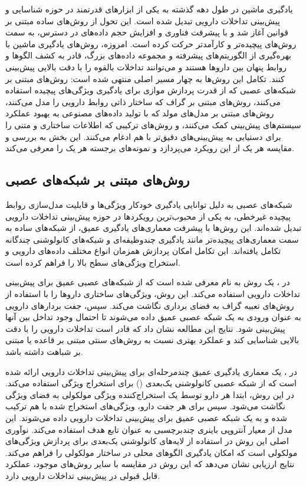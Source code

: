 یادگیری ماشین در طول دهه گذشته به یکی از ابزارهای قدرتمند در حوزه شناسایی و پیش‌بینی تداخلات دارویی تبدیل شده است. این تحول از روش‌های ساده مبتنی بر قوانین آغاز شد و با پیشرفت فناوری و افزایش حجم داده‌های در دسترس، به سمت روش‌های پیچیده‌تر و کارآمدتر حرکت کرده است. امروزه، روش‌های یادگیری ماشین با بهره‌گیری از الگوریتم‌های پیشرفته و مجموعه داده‌های بزرگ، قادر به کشف الگوها و روابط پنهان بین داروها هستند و می‌توانند تداخلات بالقوه را با دقت بالایی پیش‌بینی کنند. تکامل این روش‌ها به چهار مسیر اصلی منتهی شده است: روش‌های مبتنی بر شبکه‌های عصبی که از قدرت پردازش موازی برای یادگیری ویژگی‌های پیچیده استفاده می‌کنند، روش‌های مبتنی بر گراف که ساختار ذاتی روابط دارویی را مدل می‌کنند، روش‌های مبتنی بر مدل‌های مولد که با تولید داده‌های مصنوعی به بهبود عملکرد سیستم‌های پیش‌بینی کمک می‌کنند، و روش‌های ترکیبی که اطلاعات ساختاری و متنی را برای دستیابی به پیش‌بینی‌های دقیق‌تر با هم ادغام می‌کنند. این بخش به بررسی و مقایسه هر یک از این رویکرد می‌پردازد و نمونه‌های برجسته هر یک را معرفی می‌کند.

\subsection{روش‌های مبتنی بر شبکه‌های عصبی}

شبکه‌های عصبی به دلیل توانایی یادگیری خودکار ویژگی‌ها و قابلیت مدل‌سازی روابط پیچیده غیرخطی، به یکی از محبوب‌ترین رویکردها در حوزه پیش‌بینی تداخلات دارویی تبدیل شده‌اند. این روش‌ها با پیشرفت معماری‌های یادگیری عمیق، از شبکه‌های ساده به سمت معماری‌های پیچیده‌تر مانند یادگیری چندوظیفه‌ای و شبکه‌های کانولوشنی چندگانه تکامل یافته‌اند. این تکامل امکان پردازش همزمان انواع مختلف داده‌های دارویی و استخراج ویژگی‌های سطح بالا را فراهم کرده است.

در \cite{ref_ryu2018}، یک روش به نام  معرفی شده است که از شبکه‌های عصبی عمیق برای پیش‌بینی تداخلات دارویی استفاده می‌کند. این روش، ویژگی‌های ساختاری داروها را با استفاده از روش‌های تعبیه گراف به فضای برداری نگاشت می‌کند. سپس، جفت بردارهای دارویی به عنوان ورودی به یک شبکه عصبی عمیق داده می‌شوند تا احتمال وجود تداخل بین آنها پیش‌بینی شود. نتایج این مطالعه نشان داد که  قادر است تداخلات دارویی را با دقت بالایی شناسایی کند و عملکرد بهتری نسبت به روش‌های سنتی مبتنی بر قاعده یا مبتنی بر شباهت داشته باشد.

در \cite{ref_kpanou2021}، یک معماری یادگیری عمیق چندمرحله‌ای برای پیش‌بینی تداخلات دارویی ارائه شده است که از شبکه عصبی کانولوشنی یک‌بعدی () برای استخراج ویژگی استفاده می‌کند. در این روش، ابتدا هر دارو توسط یک استخراج‌کننده ویژگی مولکولی به فضای ویژگی نگاشت می‌شود. سپس برای هر جفت دارو، ویژگی‌های استخراج شده با هم ترکیب شده و به یک شبکه عصبی عمیق برای پیش‌بینی تداخلات دارویی داده می‌شوند. این مدل از معیار آنتروپی باینری چندبرچسبی به عنوان تابع هدف استفاده می‌کند. نوآوری اصلی این روش در استفاده از لایه‌های کانولوشنی یک‌بعدی برای پردازش ویژگی‌های مولکولی است که امکان یادگیری الگوهای محلی در ساختار مولکولی را فراهم می‌کند. نتایج ارزیابی نشان می‌دهد که این روش در مقایسه با سایر روش‌های موجود، عملکرد قابل قبولی در پیش‌بینی تداخلات دارویی دارد.

